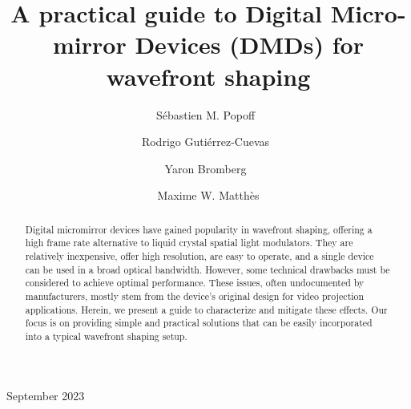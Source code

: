 \documentclass[12pt]{iopart}
\begin{document}
\title{A practical guide to Digital Micro-mirror Devices (DMDs) for wavefront shaping}

\author{Sébastien M. Popoff~}
\address{Institut Langevin, ESPCI Paris, PSL University, CNRS, France}

\author{Rodrigo Gutiérrez-Cuevas~}
\address{Institut Langevin, ESPCI Paris, PSL University, CNRS, France}

\author{Yaron Bromberg~}
\address{Racah Institute of Physics, The Hebrew University of Jerusalem, Israel}

\author{Maxime W. Matthès}
\address{Institut Langevin, ESPCI Paris, PSL University, CNRS, France}

\vspace{10pt}
\begin{indented}
  \item[]September 2023
\end{indented}

\begin{abstract}
  Digital micromirror devices have gained popularity in wavefront shaping,
  offering a high frame rate alternative to liquid crystal spatial light modulators.
  They are relatively inexpensive, offer high resolution,
  are easy to operate, and a single device can be used in a broad optical bandwidth.
  However, some technical drawbacks must be considered
  to achieve optimal performance.
  These issues, often undocumented by manufacturers,
  mostly stem from the device's original design for video projection applications.
  Herein, we present a guide to characterize and mitigate these effects.
  Our focus is on providing simple and practical solutions
  that can be easily incorporated into a typical wavefront shaping setup.
\end{abstract}

%
%
%
% 
%
\end{document}
